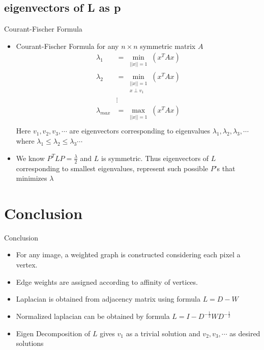 \documentclass{beamer}
\begin{document}
\subsection{eigenvectors of L as p}

\begin{frame}{Courant-Fischer Formula}

\begin{itemize}
	\item Courant-Fischer Formula for any $n \times n$ symmetric matrix $A$
    \begin{align*}
    	\lambda_1 &= {\min}_{\substack{||x|| = 1}} ( x^TAx ) \\
        \lambda_2 &= {\min}_{\substack{||x|| = 1 \\ x \perp v_1}} ( x^TAx ) \\
         & \vdots \\
        \lambda_{max} &= {\max}_{\substack{||x|| = 1}} ( x^TAx ) \\
    \end{align*} Here $v_1, v_2, v_3, \cdots$ are eigenvectors corresponding to eigenvalues $\lambda_1, \lambda_2, \lambda_3, \cdots$ where $\lambda_1 \leq \lambda_2 \leq \lambda_3 \cdots$
    
    \item We know $P^TLP = \frac{\lambda}{2}$ and $L$ is symmetric. Thus eigenvectors of $L$ corresponding to smallest eigenvalues, represent such possible $P$'s that minimizes $\lambda$

\end{itemize}

\end{frame}


\section{Conclusion}

\begin{frame}{Conclusion}

\begin{itemize}
	
    \item For any image, a weighted graph is constructed considering each pixel a vertex.
    \item Edge weights are assigned according to affinity of vertices.
    \item Laplacian is obtained from adjacency matrix using formula $L = D - W$
    \item Normalized laplacian can be obtained by formula $L = I - D^{-\frac{1}{2}}WD^{-\frac{1}{2}}$
    \item Eigen Decomposition of $L$ gives $v_1$ as a trivial solution and $v_2, v_3, \cdots$ as desired solutions
    
\end{itemize}

\end{frame}
\end{document}

